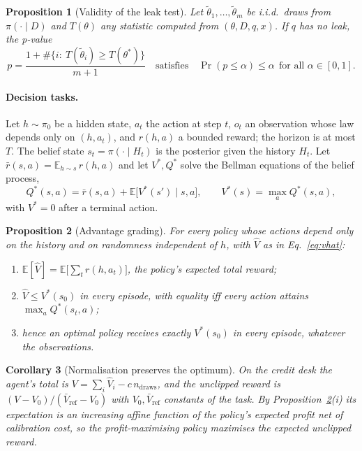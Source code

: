 \documentclass[10pt]{article}
\newtheorem{proposition}{Proposition}
\newtheorem{corollary}[proposition]{Corollary}
\theoremstyle{definition}
\theoremstyle{remark}
\theoremstyle{plain}
\newcommand{\E}{\mathbb{E}}
\newcommand{\thetastar}{\theta^{*}}
\begin{document}
\begin{proposition}[Validity of the leak test]\label{prop:ppc}
Let $\tilde\theta_1,\dots,\tilde\theta_m$ be i.i.d.\ draws from $\pi(\cdot\mid D)$ and $T(\theta)$
any statistic computed from $(\theta,D,q,x)$. If $q$ has no leak, the p-value
\[
p=\frac{1+\#\{i:\ T(\tilde\theta_i)\ge T(\thetastar)\}}{m+1}
\quad\text{satisfies}\quad \Pr(p\le\alpha)\le\alpha\ \ \text{for all }\alpha\in[0,1].
\]
\end{proposition}

\paragraph{Decision tasks.} Let $h\sim\pi_0$ be a hidden state, $a_t$ the action at step $t$,
$o_t$ an observation whose law depends only on $(h,a_t)$, and $r(h,a)$ a bounded reward; the
horizon is at most $T$. The belief state $s_t=\pi(\cdot\mid H_t)$ is the posterior given the
history $H_t$. Let $\bar r(s,a)=\E_{h\sim s}\,r(h,a)$ and let $V^{*},Q^{*}$ solve the Bellman
equations of the belief process,
\[
Q^{*}(s,a)=\bar r(s,a)+\E\big[V^{*}(s')\mid s,a\big],\qquad V^{*}(s)=\max_a Q^{*}(s,a),
\]
with $V^{*}=0$ after a terminal action.

\begin{proposition}[Advantage grading]\label{prop:adv}
For every policy whose actions depend only on the history and on randomness independent of $h$,
with $\hat V$ as in Eq.~\eqref{eq:vhat}:
\begin{enumerate}
\item[(i)] $\E[\hat V]=\E\big[\sum_t r(h,a_t)\big]$, the policy's expected total reward;
\item[(ii)] $\hat V\le V^{*}(s_0)$ in every episode, with equality iff every action attains
$\max_a Q^{*}(s_t,a)$;
\item[(iii)] hence an optimal policy receives exactly $V^{*}(s_0)$ in every episode, whatever the
observations.
\end{enumerate}
\end{proposition}

\begin{corollary}[Normalisation preserves the optimum]\label{cor:norm}
On the credit desk the agent's total is $V=\sum_i\hat V_i-c\,n_{\mathrm{draws}}$, and the unclipped
reward is $(V-V_0)/(\bar V_\mathrm{ref}-V_0)$ with $V_0,\bar V_\mathrm{ref}$ constants of the
task. By Proposition~\ref{prop:adv}(i) its expectation is an increasing affine function of the
policy's expected profit net of calibration cost, so the profit-maximising policy maximises the
expected unclipped reward.
\end{corollary}
\end{document}
